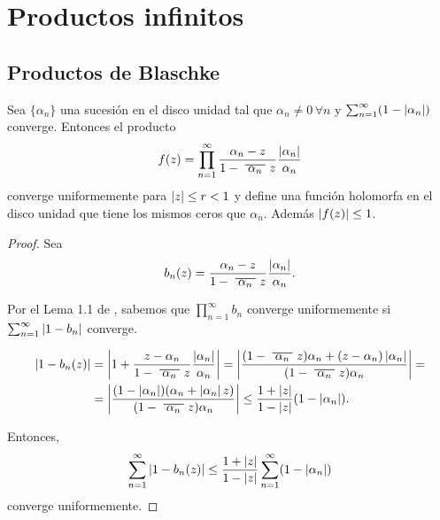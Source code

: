 \chapter{Productos infinitos}

\section{Productos de Blaschke}

\begin{prop}
    Sea $\{\alpha_n\}$ una sucesión en el disco unidad tal que $\alpha_n \not = 0 \, \forall n$ y $\sum_{n=1}^{\infty} (1 - \left\lvert\alpha_n\right\rvert)$ converge. Entonces el producto
    \begin{equation*}
        f(z) = \prod_{n=1}^{\infty} \frac{\alpha_n - z}{1 - \xbar{\alpha_n}z} \dfrac{\abs{\alpha_n}}{\alpha_n}
    \end{equation*}
    converge uniformemente para $\left\lvert z\right\rvert \leq r < 1$ y define una función holomorfa en el disco unidad que tiene los mismos ceros que $\alpha_n$. Además $\left\lvert f(z)\right\rvert \leq 1$.
\end{prop}

\begin{proof}
    Sea
    \begin{equation*}
        b_n (z) = \frac{\alpha_n - z}{1 - \xbar{\alpha_n}z} \dfrac{\abs{\alpha_n}}{\alpha_n}.
    \end{equation*}

    Por el Lema 1.1 de \citet[chap. 13]{lang}, sabemos que $\prod_{n=1}^{\infty} b_n$ converge uniformemente si $\sum_{n=1}^{\infty} \left\lvert1 - b_n\right\rvert$ converge.

    \begin{equation*}
        \begin{split}
            \abs{1 - b_n(z)} & = \abs{1 + \dfrac{z - \alpha_n}{1 - \xbar{\alpha_n}z} \dfrac{\abs{\alpha_n}}{\alpha_n}} = \abs{\dfrac{(1 - \xbar{\alpha_n}z) \alpha_n + (z - \alpha_n) \abs{\alpha_n}}{(1 - \xbar{\alpha_n}z) \alpha_n}} = \\
                             & = \abs{ \dfrac{(1 - \abs{\alpha_n}) (\alpha_n + \abs{\alpha_n} z)}{(1 - \xbar{\alpha_n}z) \alpha_n}} \leq \dfrac{1 + \abs{z}}{1 - \abs{z}} (1 - \abs{\alpha_n}).
        \end{split}
    \end{equation*}

    Entonces,
    \begin{equation*}
        \sum_{n=1}^{\infty} \left\lvert1 - b_n(z)\right\rvert \leq \dfrac{1 + \left\lvert z\right\rvert}{1 - \left\lvert z\right\rvert} \sum_{n=1}^{\infty} (1 - \left\lvert\alpha_n\right\rvert)
    \end{equation*}
    converge uniformemente.
\end{proof}
